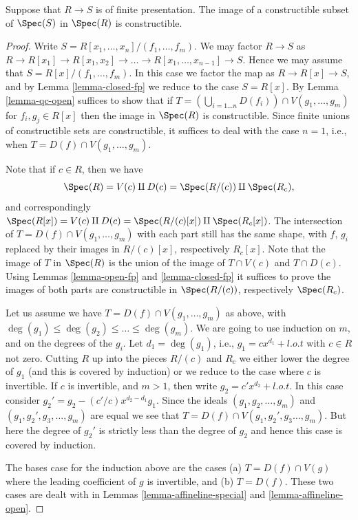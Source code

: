 \begin{theorem}
\label{theorem-chevalley}
Suppose that $R \to S$ is of finite presentation.
The image of a constructible subset of
$\Spec(S)$ in $\Spec(R)$ is constructible.
\end{theorem}

\begin{proof}
Write $S = R[x_1, \ldots, x_n]/(f_1, \ldots, f_m)$.
We may factor $R \to S$ as $R \to R[x_1] \to R[x_1, x_2]
\to \ldots \to R[x_1, \ldots, x_{n-1}] \to S$. Hence
we may assume that $S = R[x]/(f_1, \ldots, f_m)$.
In this case we factor the map as $R \to R[x] \to S$,
and by Lemma \ref{lemma-closed-fp} we reduce to
the case $S = R[x]$. By Lemma \ref{lemma-qc-open} suffices
to show that if
$T = (\bigcup_{i = 1\ldots n} D(f_i)) \cap V(g_1, \ldots, g_m)$
for $f_i , g_j \in R[x]$ then the image in $\Spec(R)$ is
constructible. Since finite unions of constructible sets
are constructible, it suffices to deal with the case $n = 1$,
i.e., when $T = D(f) \cap V(g_1, \ldots, g_m)$.

\medskip\noindent
Note that if $c \in R$, then we have
$$
\Spec(R) =
V(c) \amalg D(c) =
\Spec(R/(c)) \amalg \Spec(R_c),
$$
and correspondingly $\Spec(R[x]) =
V(c) \amalg D(c) = \Spec(R/(c)[x]) \amalg
\Spec(R_c[x])$. The intersection of $T = D(f) \cap V(g_1, \ldots, g_m)$
with each part still has the same shape, with $f$, $g_i$ replaced
by their images in $R/(c)[x]$, respectively $R_c[x]$.
Note that the image of $T$
in $\Spec(R)$ is the union of the image of
$T \cap V(c)$ and $T \cap D(c)$. Using Lemmas \ref{lemma-open-fp}
and \ref{lemma-closed-fp} it suffices to prove the images of both
parts are constructible in $\Spec(R/(c))$, respectively
$\Spec(R_c)$.

\medskip\noindent
Let us assume we have $T = D(f) \cap V(g_1, \ldots, g_m)$
as above, with $\deg(g_1) \leq \deg(g_2) \leq \ldots \leq \deg(g_m)$.
We are going to use induction on $m$, and on the
degrees of the $g_i$. Let $d_1 = \deg(g_1)$, i.e., $g_1 = c x^{d_1} + l.o.t$
with $c \in R$ not zero. Cutting $R$ up into the pieces
$R/(c)$ and $R_c$ we either lower the degree of $g_1$ (and this
is covered by induction)
or we reduce to the case where $c$ is invertible.
If $c$ is invertible, and $m > 1$, then write
$g_2 = c' x^{d_2} + l.o.t$. In this case consider
$g_2' = g_2 - (c'/c) x^{d_2 - d_1} g_1$. Since the ideals
$(g_1, g_2, \ldots, g_m)$ and $(g_1, g_2', g_3, \ldots, g_m)$
are equal we see that $T = D(f) \cap V(g_1, g_2', g_3\ldots, g_m)$.
But here the degree of $g_2'$ is strictly less than the degree
of $g_2$ and hence this case is covered by induction.

\medskip\noindent
The bases case for the induction above are the cases
(a) $T = D(f) \cap V(g)$ where the leading coefficient
of $g$ is invertible, and (b) $T = D(f)$. These two cases
are dealt with in Lemmas \ref{lemma-affineline-special}
and \ref{lemma-affineline-open}.
\end{proof}